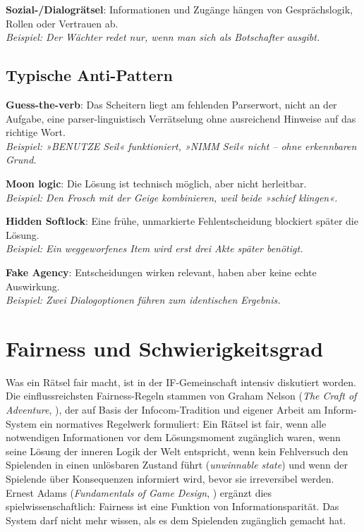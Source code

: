 \documentclass[parskip=half,a4paper,11pt]{scrreprt}
\begin{document}
\textbf{Sozial-/Dialogrätsel}: Informationen und Zugänge hängen von Gesprächslogik, Rollen oder Vertrauen ab. \\
\textit{Beispiel: Der Wächter redet nur, wenn man sich als Botschafter ausgibt.}

\subsection{Typische Anti-Pattern}

\textbf{Guess-the-verb}: Das Scheitern liegt am fehlenden Parserwort, nicht an der Aufgabe, eine parser-linguistisch Verrätselung ohne ausreichend Hinweise auf  das richtige Wort.\\
\textit{Beispiel: »BENUTZE Seil« funktioniert, »NIMM Seil« nicht – ohne erkennbaren Grund.}

\textbf{Moon logic}: Die Lösung ist technisch möglich, aber nicht herleitbar. \\
\textit{Beispiel: Den Frosch mit der Geige kombinieren, weil beide »schief klingen«.}

\textbf{Hidden Softlock}: Eine frühe, unmarkierte Fehlentscheidung blockiert später die Lösung. \\
\textit{Beispiel: Ein weggeworfenes Item wird erst drei Akte später benötigt.}

\textbf{Fake Agency}: Entscheidungen wirken relevant, haben aber keine echte Auswirkung. \\
\textit{Beispiel: Zwei Dialogoptionen führen zum identischen Ergebnis.}

\section{Fairness und Schwierigkeitsgrad}

Was ein Rätsel fair macht, ist in der IF-Gemeinschaft intensiv diskutiert worden. Die einflussreichsten Fairness-Regeln stammen von Graham Nelson (\textit{The Craft of Adventure}, \citep{Nelson1994}), der auf Basis der Infocom-Tradition und eigener Arbeit am Inform-System ein normatives Regelwerk formuliert: Ein Rätsel ist fair, wenn alle notwendigen Informationen vor dem Lösungsmoment zugänglich waren, wenn seine Lösung der inneren Logik der Welt entspricht, wenn kein Fehlversuch den Spielenden in einen unlösbaren Zustand führt (\textit{unwinnable state}) und wenn der Spielende über Konsequenzen informiert wird, bevor sie irreversibel werden. Ernest Adams (\textit{Fundamentals of Game Design}, \citep{Adams2010}) ergänzt dies spielwissenschaftlich: Fairness ist eine Funktion von Informationsparität. Das System darf nicht mehr wissen, als es dem Spielenden zugänglich gemacht hat.
\end{document}
